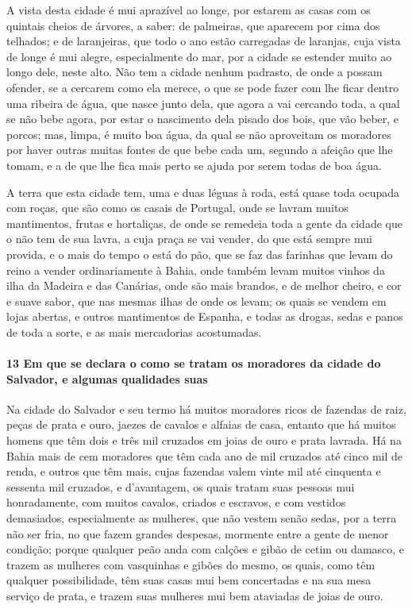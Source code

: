 A vista desta cidade é mui aprazível ao longe, por estarem as casas com os quintais cheios
de árvores, a saber: de palmeiras, que aparecem por cima dos telhados; e de laranjeiras,
que todo o ano estão carregadas de laranjas, cuja vista de longe é mui alegre,
especialmente do mar, por a cidade se estender muito ao longo dele, neste alto. Não tem a
cidade nenhum padrasto, de onde a possam ofender, se a cercarem como ela merece, o que se
pode fazer com lhe ficar dentro uma ribeira de água, que nasce junto dela, que agora a vai
cercando toda, a qual se não bebe agora, por estar o nascimento dela pisado dos bois, que
vão beber, e porcos; mas, limpa, é muito boa água, da qual se não aproveitam os moradores
por haver outras muitas fontes de que bebe cada um, segundo a afeição que lhe tomam, e a
de que lhe fica mais perto se ajuda por serem todas de boa água.

A terra que esta cidade tem, uma e duas léguas à roda, está quase toda ocupada com roças,
que são como os casais de Portugal, onde se lavram muitos mantimentos, frutas e
hortaliças, de onde se remedeia toda a gente da cidade que o não tem de sua lavra, a cuja
praça se vai vender, do que está sempre mui provida, e o mais do tempo o está do pão, que
se faz das farinhas que levam do reino a vender ordinariamente à Bahia, onde também levam
muitos vinhos da ilha da Madeira e das Canárias, onde são mais brandos, e de melhor
cheiro, e cor e suave sabor, que nas mesmas ilhas de onde os levam; os quais se vendem em
lojas abertas, e outros mantimentos de Espanha, e todas as drogas, sedas e panos de toda a
sorte, e as mais mercadorias acostumadas.

\paragraph{13 Em que se declara o como se tratam os moradores da cidade do Salvador, e
algumas qualidades suas}

Na cidade do Salvador e seu termo há muitos moradores ricos de fazendas de raiz, peças de
prata e ouro, jaezes de cavalos e alfaias de casa, entanto que há muitos homens que têm
dois e três mil cruzados em joias de ouro e prata lavrada. Há na Bahia mais de cem
moradores que têm cada ano de mil cruzados até cinco mil de renda, e outros que têm mais,
cujas fazendas valem vinte mil até cinquenta e sessenta mil cruzados, e d'avantagem, os
quais tratam suas pessoas mui honradamente, com muitos cavalos, criados e escravos, e com
vestidos demasiados, especialmente as mulheres, que não vestem senão sedas, por a terra
não ser fria, no que fazem grandes despesas, mormente entre a gente de menor condição;
porque qualquer peão anda com calções e gibão de cetim ou damasco, e trazem as mulheres
com vasquinhas e gibões do mesmo, os quais, como têm qualquer possibilidade, têm suas
casas mui bem concertadas e na sua mesa serviço de prata, e trazem suas mulheres mui bem
ataviadas de joias de ouro.

